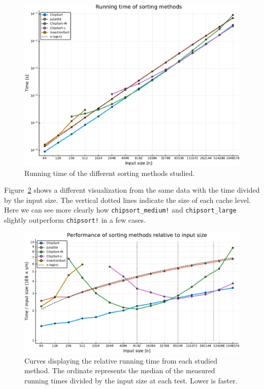 \documentclass{juliacon}
\begin{document}
\begin{figure}[htb]
\centerline{\includegraphics[width=\linewidth]{fig/chipsort-bench-time.pdf}}
\caption{Running time of the different sorting methods studied.}
\label{fig:bench-time}
\end{figure}

Figure~\ref{fig:bench-curves} shows a different visualization from the same data with the time divided by the input size. The vertical dotted lines indicate the size of each cache level. Here we can see more clearly how {\tt chipsort\_medium!} and {\tt chipsort\_large} slightly outperform {\tt chipsort!} in a few cases.

\begin{figure}[htb]
\centerline{\includegraphics[width=\linewidth]{fig/chipsort-bench-curves.pdf}}
\caption{Curves displaying the relative running time from each studied method. The ordinate represents the median of the measured running times divided by the input size at each test. Lower is faster.}
\label{fig:bench-curves}
\end{figure}
\end{document}
